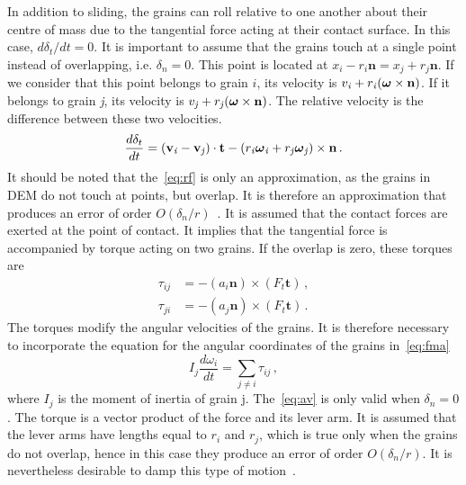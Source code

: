 In addition to sliding, the grains can roll relative to one another about their 
centre of mass due to the tangential force acting at their contact surface. In 
this case, $d\delta_{t}/dt=0$. It is important to assume that the grains touch 
at a single point instead of overlapping, i.e. $\delta_{n}=0$. This point is 
located at 
${x}_{\mathit{i}}-r_{\mathit{i}}\mathbf{n}={x}_{\mathit{j}}+r_{\mathit{j}}\mathbf{n}$.
 If we consider that this point belongs to grain $\mathit{i}$, its velocity is 
${v}_{\mathit{i}}+r_{\mathit{i}}(\mbox{\boldmath${\omega}$}\times\mathbf{n})$. 
If it belongs to grain \textit{j}, its velocity is 
${v}_{\mathit{j}}+r_{\mathit{j}}(\mbox{\boldmath${\omega}$}\times\mathbf{n})$. 
The relative velocity is the difference between these two velocities. 
%
\begin{equation}
\frac{d\delta_{t}}{dt}=(\mathbf{v}_{\mathit{i}}-{\mathbf{v}}_{\mathit{j}})\cdot 
\mathbf{t} 
-(r_{\mathit{i}} \mbox{\boldmath${\omega}$}_{\mathit{i}}
+r_{\mathit{j}}\mbox{\boldmath${\omega}$}_{\mathit{j}})\times\mathbf{n} \,.
\label{eq:rf}
\end{equation}
%
It should be noted that the~\cref{eq:rf} is only an approximation, as the 
grains in DEM do not touch at points, but overlap. It is therefore an 
approximation that produces an error of order 
$\mathbf{\mathit{O}}(\delta_{n}/r)$~\citep{Radjai2011}. It is 
assumed that the contact forces are exerted at the point of contact. It implies 
that the tangential force is accompanied by torque acting on two grains. If the 
overlap is zero, these torques are
%
\begin{align}
\tau_{\mathit{ij}} & = -(a_{\mathit{i}}\mathbf{n})\times(F_{t}\mathbf{t}) \,,\\
\tau_{\mathit{ji}} & = -(a_{\mathit{j}}\mathbf{n})\times(F_{t}\mathbf{t}) \,.
\label{eq:av}
\end{align}
%
The torques modify the angular velocities of the grains. It is therefore 
necessary to incorporate the equation for the angular coordinates of the grains 
in~\cref{eq:fma}
%
\begin{equation}
\mathit{I}_{j}\frac{d\omega_{i}}{dt}=\sum\limits_{j\ne i}{\tau_{ij}} \,,
\end{equation}
%
where $\mathit{I}_{j}$ is the moment of inertia of grain j. The~\cref{eq:av} is 
only valid when $\delta_{n}=0$. The torque is a vector product of the force and 
its lever arm. It is assumed that the lever arms have lengths equal to 
$r_{\mathit{i}}$ and $r_{\mathit{j}}$, which is true only when the grains do 
not overlap, hence in this case they produce an error of order 
$\mathbf{\mathit{O}}(\delta_{n}/r)$. It is nevertheless desirable to damp this 
type of motion~\citep{Radjai2011}. 


